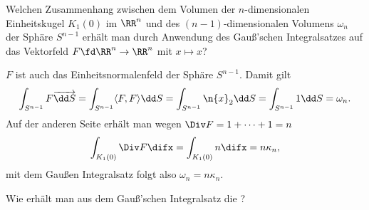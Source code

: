 \begin{frage}
  Welchen Zusammenhang zwischen dem Volumen der $n$-dimensionalen 
  Einheitskugel $K_1(0)$ im $\RR^n$ 
  und des $(n-1)$-dimensionalen Volumens $\omega_n$ der 
  Sphäre $S^{n-1}$ erhält man durch Anwendung des Gauß'schen Integralsatzes 
  auf das Vektorfeld $F\fd \RR^n\to\RR^n$ mit $x\mapsto x$?
\end{frage}

\begin{antwort}
  $F$ ist auch das Einheitsnormalenfeld der Sphäre $S^{n-1}$. Damit 
  gilt 
  \[
  \int_{S^{n-1}} F\overrightarrow{\dd S} = 
  \int_{S^{n-1}} \langle F, F \rangle \dd S = 
  \int_{S^{n-1}} \n{x}_2 \dd S = 
  \int_{S^{n-1}} 1 \dd S = \omega_n.
  \]
  Auf der anderen Seite erhält man wegen $\Div F=1+\cdots+1=n$ 
  \[
  \int_{K_1(0)} \Div F \difx =  
  \int_{K_1(0)} n \difx = n\kappa_n,
  \]
  mit dem Gauß\sch en Integralsatz folgt also $\omega_n = n \kappa_n$. \AntEnd 
\end{antwort} 



\begin{frage}
  Wie erhält man aus dem Gauß'schen Integralsatz die 
  ?
\end{frage}


